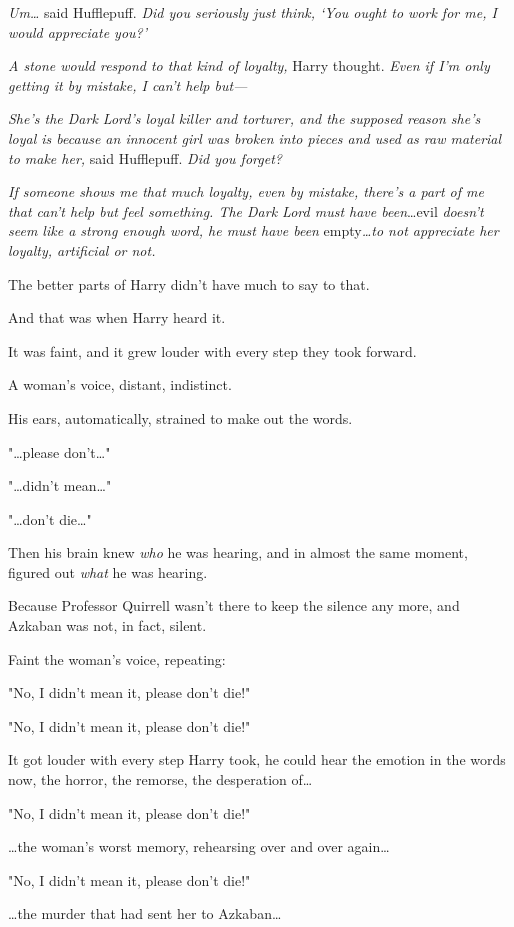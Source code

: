 \emph{Um…} said Hufflepuff. \emph{Did you seriously just think, `You
ought to work for me, \emph{I} would appreciate you?'}

\emph{A stone would respond to that kind of loyalty,} Harry thought. \emph{Even
if I'm only getting it by mistake, I can't help but—}

\emph{She's the Dark Lord's loyal killer and torturer, and the supposed reason
she's loyal is because an innocent girl was broken into pieces and used as raw
material to make her,} said Hufflepuff. \emph{Did you forget?}

\emph{If someone shows me that much loyalty, even by mistake, there's a part of
me that can't help but feel something. The Dark Lord must have been}…evil
\emph{doesn't seem like a strong enough word, he must have been}
empty\emph{…to not appreciate her loyalty, artificial or not.}

The better parts of Harry didn't have much to say to that.

And that was when Harry heard it.

It was faint, and it grew louder with every step they took forward.

A woman's voice, distant, indistinct.

His ears, automatically, strained to make out the words.

"…please don't…"

"…didn't mean…"

"…don't die…"

Then his brain knew \emph{who} he was hearing, and in almost the same moment,
figured out \emph{what} he was hearing.

Because Professor Quirrell wasn't there to keep the silence any more, and
Azkaban was not, in fact, silent.

Faint the woman's voice, repeating:

"No, I didn't mean it, please don't die!"

"No, I didn't mean it, please don't die!"

It got louder with every step Harry took, he could hear the emotion in the
words now, the horror, the remorse, the desperation of…

"No, I didn't mean it, please don't die!"

…the woman's worst memory, rehearsing over and over again…

"No, I didn't mean it, please don't die!"

…the murder that had sent her to Azkaban…


